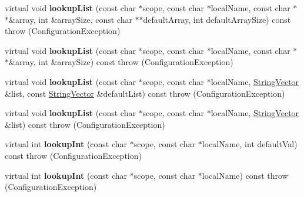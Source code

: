 \begin{DoxyCompactItemize}
\item 
\hypertarget{classCONFIG4CPP__NAMESPACE_1_1ConfigurationImpl_a55b63941c0e59c01f2448b573ce89d25}{virtual void {\bfseries lookup\-List} (const char $\ast$scope, const char $\ast$local\-Name, const char $\ast$$\ast$\&array, int \&array\-Size, const char $\ast$$\ast$default\-Array, int default\-Array\-Size) const   throw (\-Configuration\-Exception)}\label{classCONFIG4CPP__NAMESPACE_1_1ConfigurationImpl_a55b63941c0e59c01f2448b573ce89d25}

\item 
\hypertarget{classCONFIG4CPP__NAMESPACE_1_1ConfigurationImpl_aa0c5c4011ccaf5c37080147a24ca1295}{virtual void {\bfseries lookup\-List} (const char $\ast$scope, const char $\ast$local\-Name, const char $\ast$$\ast$\&array, int \&array\-Size) const   throw (\-Configuration\-Exception)}\label{classCONFIG4CPP__NAMESPACE_1_1ConfigurationImpl_aa0c5c4011ccaf5c37080147a24ca1295}

\item 
\hypertarget{classCONFIG4CPP__NAMESPACE_1_1ConfigurationImpl_a15e9e76cf80a89dd99ca4a1758569869}{virtual void {\bfseries lookup\-List} (const char $\ast$scope, const char $\ast$local\-Name, \hyperlink{classCONFIG4CPP__NAMESPACE_1_1StringVector}{String\-Vector} \&list, const \hyperlink{classCONFIG4CPP__NAMESPACE_1_1StringVector}{String\-Vector} \&default\-List) const   throw (\-Configuration\-Exception)}\label{classCONFIG4CPP__NAMESPACE_1_1ConfigurationImpl_a15e9e76cf80a89dd99ca4a1758569869}

\item 
\hypertarget{classCONFIG4CPP__NAMESPACE_1_1ConfigurationImpl_ae467ea528d27e6a9bee2b17fcf173a38}{virtual void {\bfseries lookup\-List} (const char $\ast$scope, const char $\ast$local\-Name, \hyperlink{classCONFIG4CPP__NAMESPACE_1_1StringVector}{String\-Vector} \&list) const   throw (\-Configuration\-Exception)}\label{classCONFIG4CPP__NAMESPACE_1_1ConfigurationImpl_ae467ea528d27e6a9bee2b17fcf173a38}

\item 
\hypertarget{classCONFIG4CPP__NAMESPACE_1_1ConfigurationImpl_a12dfdeb394443a52c13a95b7a9710737}{virtual int {\bfseries lookup\-Int} (const char $\ast$scope, const char $\ast$local\-Name, int default\-Val) const   throw (\-Configuration\-Exception)}\label{classCONFIG4CPP__NAMESPACE_1_1ConfigurationImpl_a12dfdeb394443a52c13a95b7a9710737}

\item 
\hypertarget{classCONFIG4CPP__NAMESPACE_1_1ConfigurationImpl_adbe6afbb72a1d0e5be21ba67eaf24698}{virtual int {\bfseries lookup\-Int} (const char $\ast$scope, const char $\ast$local\-Name) const   throw (\-Configuration\-Exception)}\label{classCONFIG4CPP__NAMESPACE_1_1ConfigurationImpl_adbe6afbb72a1d0e5be21ba67eaf24698}


\end{DoxyCompactItemize}
